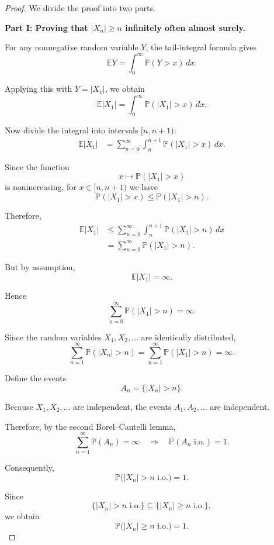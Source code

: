 \begin{proof}

We divide the proof into two parts.

\medskip

\noindent
\textbf{Part I: Proving that $|X_n|\geq n$ infinitely often almost surely.}

For any nonnegative random variable $Y$, the tail-integral formula gives
\[
    \mathbb{E}Y
    =
    \int_0^\infty \mathbb{P}(Y>x)\,dx.
\]

Applying this with $Y=|X_1|$, we obtain
\[
    \mathbb{E}|X_1|
    =
    \int_0^\infty
    \mathbb{P}(|X_1|>x)\,dx.
\]

Now divide the integral into intervals $[n,n+1)$:
\[
\begin{aligned}
    \mathbb{E}|X_1|
    &=
    \sum_{n=0}^\infty
    \int_n^{n+1}
    \mathbb{P}(|X_1|>x)\,dx.
\end{aligned}
\]

Since the function
\[
    x\longmapsto\mathbb{P}(|X_1|>x)
\]
is nonincreasing, for $x\in[n,n+1)$ we have
\[
    \mathbb{P}(|X_1|>x)
    \leq
    \mathbb{P}(|X_1|>n).
\]

Therefore,
\[
\begin{aligned}
    \mathbb{E}|X_1|
    &\leq
    \sum_{n=0}^\infty
    \int_n^{n+1}
    \mathbb{P}(|X_1|>n)\,dx
    \\
    &=
    \sum_{n=0}^\infty
    \mathbb{P}(|X_1|>n).
\end{aligned}
\]

But by assumption,
\[
    \mathbb{E}|X_1|=\infty.
\]

Hence
\[
    \sum_{n=0}^\infty
    \mathbb{P}(|X_1|>n)
    =\infty.
\]

Since the random variables $X_1,X_2,\ldots$ are identically distributed,
\[
    \sum_{n=1}^\infty
    \mathbb{P}(|X_n|>n)
    =
    \sum_{n=1}^\infty
    \mathbb{P}(|X_1|>n)
    =\infty.
\]

Define the events
\[
    A_n=\{|X_n|>n\}.
\]

Because $X_1,X_2,\ldots$ are independent, the events
$A_1,A_2,\ldots$ are independent.

Therefore, by the second Borel--Cantelli lemma,
\[
    \sum_{n=1}^\infty\mathbb{P}(A_n)=\infty
    \quad\Longrightarrow\quad
    \mathbb{P}(A_n\text{ i.o.})=1.
\]

Consequently,
\[
    \mathbb{P}\bigl(|X_n|>n\text{ i.o.}\bigr)=1.
\]

Since
\[
    \{|X_n|>n\text{ i.o.}\}
    \subseteq
    \{|X_n|\geq n\text{ i.o.}\},
\]
we obtain
\[
    \boxed{
    \mathbb{P}\bigl(|X_n|\geq n\text{ i.o.}\bigr)=1.
    }
    \]



\end{proof}
